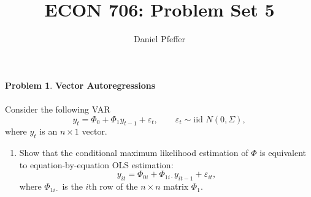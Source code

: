 \documentclass[oneside,reqno]{amsart}
\title{ECON 706: Problem Set 5}
\author{Daniel Pfeffer}
\newcommand{\eps}{\varepsilon}
\theoremstyle{definition}
\newtheorem{prob}{Problem}
\begin{document}
\maketitle

\begin{prob}
\textbf{Vector Autoregressions} 
\\ \\
Consider the following VAR
\[
	y_t = \Phi_0 + \Phi_1 y_{t-1} + \eps_t,
	\qquad 
	\eps_t \sim \text{iid }N(0, \Sigma),
\]
where $y_t$ is an $n \times 1$ vector. 
\end{prob}

\begin{enumerate}
\item
Show that the conditional maximum likelihood estimation of $\Phi$ is equivalent to equation-by-equation OLS estimation:
\[
	y_{it} = \Phi_{0i} + \Phi_{1i \cdot} y_{it-1} + \eps_{it},
\]	
where $\Phi_{1i \cdot}$ is the $i$th row of the $n\times n$ matrix $\Phi_1$.


\end{enumerate}
\end{document}

